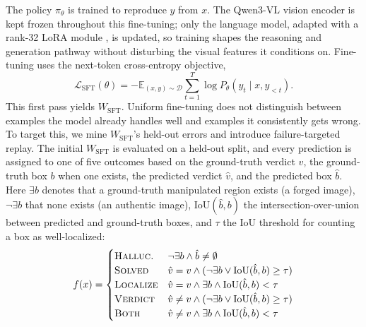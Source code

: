 \documentclass[10pt,twocolumn,letterpaper]{article}
\begin{document}
The policy $\pi_\theta$ is trained to reproduce $y$ from $x$. The Qwen3-VL vision encoder is kept frozen throughout this fine-tuning; only the language model, adapted with a rank-32 LoRA module \cite{lora2021}, is updated, so training shapes the reasoning and generation pathway without disturbing the visual features it conditions on. Fine-tuning uses the next-token cross-entropy objective,
\begin{equation}
\mathcal{L}_{\mathrm{SFT}}(\theta) = -\mathbb{E}_{(x,y)\sim\mathcal{D}}\sum_{t=1}^{T}\log P_\theta(y_t \mid x, y_{<t}).
\label{eq:sft}
\end{equation}
This first pass yields  $W_{\mathrm{SFT}}$. Uniform fine-tuning does not distinguish between examples the model already handles well and examples it consistently gets wrong. To target this, we mine $W_{\mathrm{SFT}}$'s held-out errors and introduce failure-targeted replay. The initial $W_{\mathrm{SFT}}$ is evaluated on a held-out split, and every prediction is assigned to one of five outcomes based on the ground-truth verdict $v$, the ground-truth box $b$ when one exists, the predicted verdict $\hat v$, and the predicted box $\hat b$. Here $\exists b$ denotes that a ground-truth manipulated region exists (a forged image), $\lnot\exists b$ that none exists (an authentic image), $\mathrm{IoU}(\hat b,b)$ the intersection-over-union between predicted and ground-truth boxes, and $\tau$ the IoU threshold for counting a box as well-localized:
\begin{equation}
f(x) = \begin{cases}
\textsc{Halluc.} & \lnot\exists b \wedge \hat b \ne \emptyset \\
\textsc{Solved} & \hat v = v \wedge (\lnot\exists b \vee \mathrm{IoU}(\hat b, b) \ge \tau) \\
\textsc{Localize} & \hat v = v \wedge \exists b \wedge \mathrm{IoU}(\hat b, b) < \tau \\
\textsc{Verdict} & \hat v \ne v \wedge (\lnot\exists b \vee \mathrm{IoU}(\hat b,b) \ge \tau) \\
\textsc{Both} & \hat v \ne v \wedge \exists b \wedge \mathrm{IoU}(\hat b,b) < \tau
\end{cases}
\label{eq:failure}
\end{equation}
\end{document}
